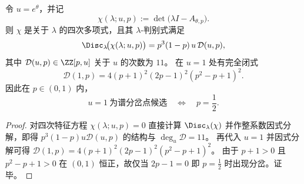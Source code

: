 \begin{proposition}[Lee--Yang 分岔点 \(u=1\) 的偏置唯一性]\label{prop:fold-gauge-anomaly-bernoulli-p-leyang-branch-u1}
令 \(u=e^\theta\)，并记
\[
\chi(\lambda;u,p):=\det\!\bigl(\lambda I-A_{\theta,p}\bigr).
\]
则 \(\chi\) 是关于 \(\lambda\) 的四次多项式，且其 \(\lambda\)-判别式满足
\[
\Disc_{\lambda}\!\bigl(\chi(\lambda;u,p)\bigr)=p^3(1-p)\,u\,\mathcal D(u,p),
\]
其中 \(\mathcal D(u,p)\in\ZZ[p,u]\) 关于 \(u\) 的次数为 \(11\)。
在 \(u=1\) 处有完全闭式
\[
\mathcal D(1,p)=4(p+1)^2(2p-1)^2(p^2-p+1)^2.
\]
因此在 \(p\in(0,1)\) 内，
\[
u=1\ \text{为谱分岔点候选}
\quad\Longleftrightarrow\quad
p=\frac12.
\]
\end{proposition}
\begin{proof}
对四次特征方程 \(\chi(\lambda;u,p)=0\) 直接计算 \(\Disc_\lambda(\chi)\) 并作整系数因式分解，即得
\(p^3(1-p)u\mathcal D(u,p)\) 的结构与 \(\deg_u\mathcal D=11\)。
再代入 \(u=1\) 并因式分解可得
\(\mathcal D(1,p)=4(p+1)^2(2p-1)^2(p^2-p+1)^2\)。
由于 \(p+1>0\) 且 \(p^2-p+1>0\) 在 \((0,1)\) 恒正，故仅当 \(2p-1=0\) 即 \(p=\tfrac12\) 时出现分岔。证毕。
\end{proof}
